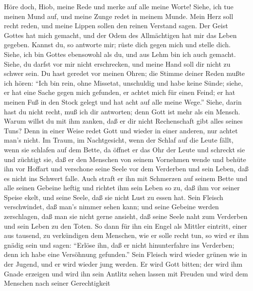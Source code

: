  Höre doch, Hiob, meine Rede und merke auf alle meine Worte!
 Siehe, ich tue meinen Mund auf, und meine Zunge redet in
meinem Munde.  Mein Herz soll recht reden, und meine Lippen
sollen den reinen Verstand sagen.  Der Geist Gottes hat mich
gemacht, und der Odem des Allmächtigen hat mir das Leben gegeben.
 Kannst du, so antworte mir; rüste dich gegen mich und
stelle dich.  Siehe, ich bin Gottes ebensowohl als du, und
aus Lehm bin ich auch gemacht.  Siehe, du darfst vor mir
nicht erschrecken, und meine Hand soll dir nicht zu schwer sein.
 Du hast geredet vor meinen Ohren; die Stimme deiner Reden
mußte ich hören:  ``Ich bin rein, ohne Missetat, unschuldig
und habe keine Sünde;  siehe, er hat eine Sache gegen mich
gefunden, er achtet mich für einen Feind;  er hat meinen
Fuß in den Stock gelegt und hat acht auf alle meine Wege.''
 Siehe, darin hast du nicht recht, muß ich dir antworten;
denn Gott ist mehr als ein Mensch.  Warum willst du mit ihm
zanken, daß er dir nicht Rechenschaft gibt alles seines Tuns?
 Denn in einer Weise redet Gott und wieder in einer
anderen, nur achtet man's nicht.  Im Traum, im
Nachtgesicht, wenn der Schlaf auf die Leute fällt, wenn sie schlafen auf
dem Bette,  da öffnet er das Ohr der Leute und schreckt sie
und züchtigt sie,  daß er den Menschen von seinem Vornehmen
wende und behüte ihn vor Hoffart  und verschone seine Seele
vor dem Verderben und sein Leben, daß es nicht ins Schwert falle.
 Auch straft er ihn mit Schmerzen auf seinem Bette und alle
seinen Gebeine heftig  und richtet ihm sein Leben so zu,
daß ihm vor seiner Speise ekelt, und seine Seele, daß sie nicht Lust zu
essen hat.  Sein Fleisch verschwindet, daß man's nimmer
sehen kann; und seine Gebeine werden zerschlagen, daß man sie nicht
gerne ansieht,  daß seine Seele naht zum Verderben und sein
Leben zu den Toten.  So dann für ihn ein Engel als Mittler
eintritt, einer aus tausend, zu verkündigen dem Menschen, wie er solle
recht tun,  so wird er ihm gnädig sein und sagen: ``Erlöse
ihn, daß er nicht hinunterfahre ins Verderben; denn ich habe eine
Versöhnung gefunden.''  Sein Fleisch wird wieder grünen wie
in der Jugend, und er wird wieder jung werden.  Er wird
Gott bitten; der wird ihm Gnade erzeigen und wird ihn sein Antlitz sehen
lassen mit Freuden und wird dem Menschen nach seiner Gerechtigkeit
